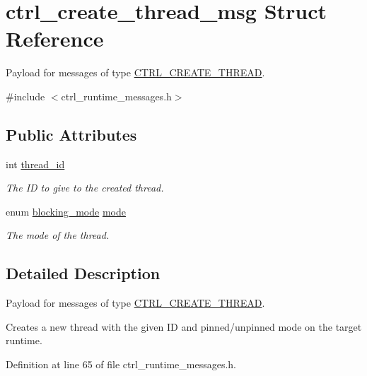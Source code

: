 \hypertarget{structctrl__create__thread__msg}{\section{ctrl\-\_\-create\-\_\-thread\-\_\-msg Struct Reference}
\label{structctrl__create__thread__msg}
}


Payload for messages of type \hyperlink{ctrl__runtime__messages_8h_aff250b7918a6975b13277c84bc6ec5b9a2e623fd9e79d281a3137762f1d5569fe}{C\-T\-R\-L\-\_\-\-C\-R\-E\-A\-T\-E\-\_\-\-T\-H\-R\-E\-A\-D}.  




{\ttfamily \#include $<$ctrl\-\_\-runtime\-\_\-messages.\-h$>$}

\subsection*{Public Attributes}
\begin{DoxyCompactItemize}
\item 
int \hyperlink{structctrl__create__thread__msg_a930a1b6ad3d62f876fa6ce4a44f2daf1}{thread\-\_\-id}
\begin{DoxyCompactList}\small\item\em The I\-D to give to the created thread. \end{DoxyCompactList}\item 
enum \hyperlink{dfg_8h_af31ca3002c5b769551da6f1183bafed5}{blocking\-\_\-mode} \hyperlink{structctrl__create__thread__msg_af74075761b9c8f46b619d33d4ef21c81}{mode}
\begin{DoxyCompactList}\small\item\em The mode of the thread. \end{DoxyCompactList}\end{DoxyCompactItemize}


\subsection{Detailed Description}
Payload for messages of type \hyperlink{ctrl__runtime__messages_8h_aff250b7918a6975b13277c84bc6ec5b9a2e623fd9e79d281a3137762f1d5569fe}{C\-T\-R\-L\-\_\-\-C\-R\-E\-A\-T\-E\-\_\-\-T\-H\-R\-E\-A\-D}. 

Creates a new thread with the given I\-D and pinned/unpinned mode on the target runtime. 

Definition at line 65 of file ctrl\-\_\-runtime\-\_\-messages.\-h.



